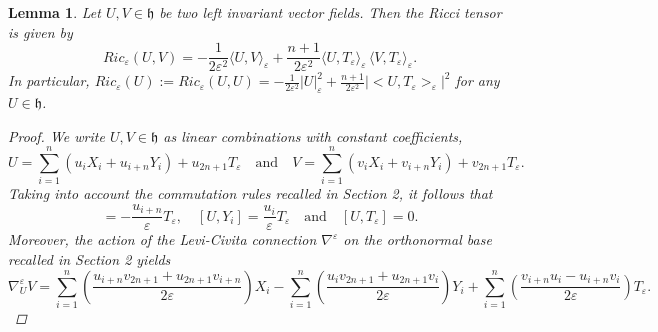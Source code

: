 \documentclass[10pt]{amsart}
\numberwithin{equation}{section}
\newtheorem{lemma}[theorem]{Lemma}
\theoremstyle{definition}
\begin{document}
\begin{lemma}\label{lem:Ricci}
Let $U, V\in \mathfrak{h}$ be two left invariant vector fields.
Then the Ricci tensor is given by
\begin{equation}\label{eq:Ricci}
Ric_{\varepsilon}(U,V) = -\dfrac{1}{2\varepsilon^2} \langle U,V\rangle_{\varepsilon} + \dfrac{n+1}{2\varepsilon^2}\langle U,T_{\varepsilon}\rangle_{\varepsilon}\, \langle V,T_{\varepsilon}\rangle_{\varepsilon}.
\end{equation}
In particular, $\displaystyle{Ric_\varepsilon(U):=Ric_\varepsilon (U,U)= -\frac{1}{2\varepsilon^2}}|U|_\varepsilon^2+\frac{n+1}{2\varepsilon^2} |<U,T_\varepsilon>_\varepsilon|^2$ for any $U \in \mathfrak{h}$.
\begin{proof}
We write $U, V \in \mathfrak{h}$ as linear combinations with constant coefficients,  
\begin{equation*}
U= \sum_{i=1}^{n}\left(u_i X_i + u_{i+n}Y_i\right) + u_{2n+1}T_{\varepsilon} \quad \textrm{and} \quad V= \sum_{i=1}^{n}\left(v_i X_i + v_{i+n}Y_i\right) + v_{2n+1}T_{\varepsilon}.
\end{equation*}
Taking into account the commutation rules recalled in Section 2, it follows that
\begin{equation*}
[U,X_i] = -\dfrac{u_{i+n}}{\varepsilon}T_{\varepsilon}, \quad  [U,Y_i] = \dfrac{u_i}{\varepsilon}T_{\varepsilon} \quad \textrm{and}\quad [U,T_{\varepsilon}]= 0.
\end{equation*}
Moreover, the action of the Levi-Civita connection $\nabla^\varepsilon$ on the orthonormal base recalled in Section 2 yields
\begin{equation*}
\nabla^{\varepsilon}_{U}V = \sum_{i=1}^{n}\left(\dfrac{u_{i+n}v_{2n+1}+u_{2n+1}v_{i+n}}{2\varepsilon}\right)X_i - \sum_{i=1}^{n}\left(\dfrac{u_{i}v_{2n+1}+u_{2n+1}v_{i}}{2\varepsilon}\right)Y_i + \sum_{i=1}^{n}\left(\dfrac{v_{i+n}u_{i}-u_{i+n}v_{i}}{2\varepsilon}\right)T_{\varepsilon}.
\end{equation*}


\end{proof}
\end{lemma}
\end{document}
